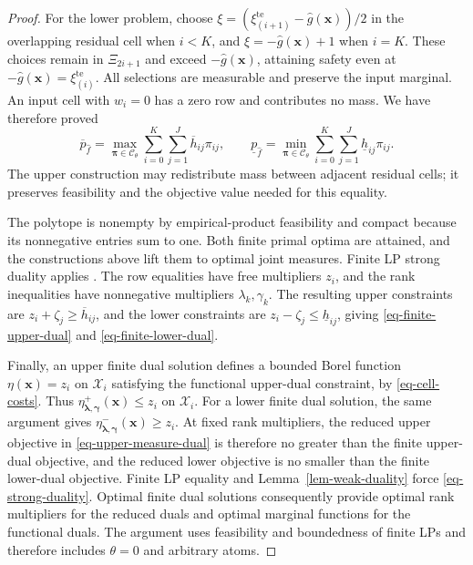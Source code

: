\documentclass[review,11pt,3p,authoryear,nopreprintline]{elsarticle}
\begin{document}
\begin{proof}
  For the lower problem, choose
  $\xi=\left(\xi_{(i+1)}^{\mathrm{te}}-\hat g(\bm x)\right)/2$ in the overlapping residual cell when $i<K$, and $\xi=-\hat g(\bm x)+1$ when $i=K$. These choices remain in $\Xi_{2i+1}$ and exceed $-\hat g(\bm x)$, attaining safety even at $-\hat g(\bm x)=\xi_{(i)}^{\mathrm{te}}$. All selections are measurable and preserve the input marginal. An input cell with $w_i=0$ has a zero row and contributes no mass. We have therefore proved
  \begin{equation}
    \overline p_{\hat f}
    =\max_{\bm\pi\in\mathcal C_\theta}\sum_{i=0}^K\sum_{j=1}^J
      \overline h_{ij}\pi_{ij},\qquad
    \underline p_{\hat f}
    =\min_{\bm\pi\in\mathcal C_\theta}\sum_{i=0}^K\sum_{j=1}^J
      \underline h_{ij}\pi_{ij}.
    \label{eq-finite-primal-values}
  \end{equation}
  The upper construction may redistribute mass between adjacent residual cells; it preserves feasibility and the objective value needed for this equality.

  The polytope is nonempty by empirical-product feasibility and compact because its nonnegative entries sum to one. Both finite primal optima are attained, and the constructions above lift them to optimal joint measures. Finite LP strong duality applies \citep[Section~5.2.3]{B.V04}. The row equalities have free multipliers $z_i$, and the rank inequalities have nonnegative multipliers $\lambda_k,\gamma_k$. The resulting upper constraints are $z_i+\zeta_j\ge\overline h_{ij}$, and the lower constraints are $z_i-\zeta_j\le\underline h_{ij}$, giving \eqref{eq-finite-upper-dual} and \eqref{eq-finite-lower-dual}.

  Finally, an upper finite dual solution defines a bounded Borel function $\eta(\bm x)=z_i$ on $\mathcal X_i$ satisfying the functional upper-dual constraint, by \eqref{eq-cell-costs}. Thus $\eta^+_{\bm\lambda,\bm\gamma}(\bm x)\le z_i$ on $\mathcal X_i$. For a lower finite dual solution, the same argument gives $\eta^-_{\bm\lambda,\bm\gamma}(\bm x)\ge z_i$. At fixed rank multipliers, the reduced upper objective in \eqref{eq-upper-measure-dual} is therefore no greater than the finite upper-dual objective, and the reduced lower objective is no smaller than the finite lower-dual objective. Finite LP equality and Lemma~\ref{lem-weak-duality} force \eqref{eq-strong-duality}. Optimal finite dual solutions consequently provide optimal rank multipliers for the reduced duals and optimal marginal functions for the functional duals. The argument uses feasibility and boundedness of finite LPs and therefore includes $\theta=0$ and arbitrary atoms.
\end{proof}
\end{document}
